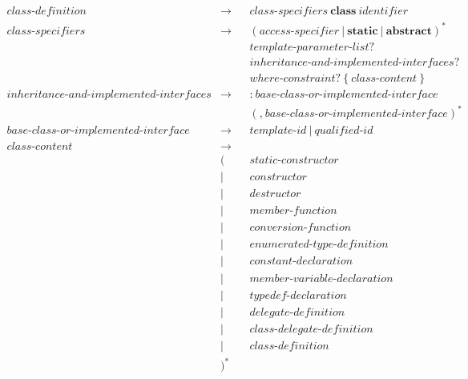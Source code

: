 \documentclass[a4paper,oneside,11pt]{article}
\begin{document}
\begin{align*}
class\textrm{-}definition &\rightarrow & &class\textrm{-}specifiers \> \textbf{class} \> \hyperref[identifier]{identifier}\\
class\textrm{-}specifiers &\rightarrow & &(\hyperref[accessspecifier]{access\textrm{-}specifier} \> | \> \textbf{static} \> | \> \textbf{abstract})^*\\
& & &\hyperref[templateparameterlist]{template\textrm{-}parameter\textrm{-}list}?\\
& & &inheritance\textrm{-}and\textrm{-}implemented\textrm{-}interfaces?\\
& & &\hyperref[whereconstraint]{where\textrm{-}constraint}? \> \texttt{\{} \> class\textrm{-}content \> \texttt{\}}\\
inheritance\textrm{-}and\textrm{-}implemented\textrm{-}interfaces &\rightarrow & &\texttt{:} \>
base\textrm{-}class\textrm{-}or\textrm{-}implemented\textrm{-}interface\\
& & &(\texttt{,} \> base\textrm{-}class\textrm{-}or\textrm{-}implemented\textrm{-}interface)^*\\
base\textrm{-}class\textrm{-}or\textrm{-}implemented\textrm{-}interface &\rightarrow & &\hyperref[templateid]{template\textrm{-}id} \> |
\> \hyperref[qualifiedid]{qualified\textrm{-}id}\\
class\textrm{-}content &\rightarrow\\
&( & &\hyperref[staticconstructor]{static\textrm{-}constructor}\\
&| & &\hyperref[constructor]{constructor}\\
&| & &\hyperref[destructor]{destructor}\\
&| & &\hyperref[memberfunction]{member\textrm{-}function}\\
&| & &\hyperref[conversionfunction]{conversion\textrm{-}function}\\
&| & &\hyperref[sec:enumerations]{enumerated\textrm{-}type\textrm{-}definition}\\
&| & &\hyperref[constantdeclaration]{constant\textrm{-}declaration}\\
&| & &\hyperref[membervariabledeclaration]{member\textrm{-}variable\textrm{-}declaration}\\
&| & &\hyperref[typedefdeclaration]{typedef\textrm{-}declaration}\\
&| & &\hyperref[delegatedefinition]{delegate\textrm{-}definition}\\
&| & &\hyperref[classdelegatedefinition]{class\textrm{-}delegate\textrm{-}definition}\\
&| & &\hyperref[classdefinition]{class\textrm{-}definition}\\
&)^*
\end{align*}
\end{document}
